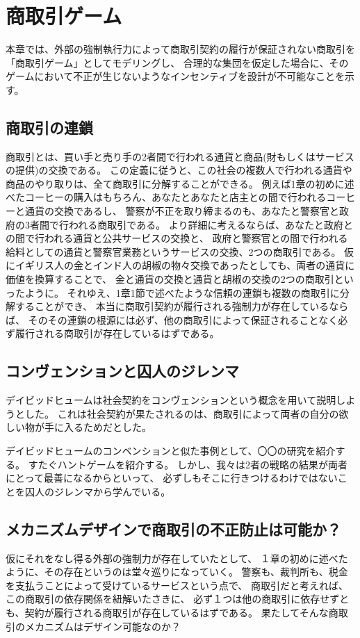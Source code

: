 \chapter{商取引ゲーム}
本章では、外部の強制執行力によって商取引契約の履行が保証されない商取引を「商取引ゲーム」としてモデリングし、
合理的な集団を仮定した場合に、そのゲームにおいて不正が生じないようなインセンティブを設計が不可能なことを示す。

\section{商取引の連鎖}
商取引とは、買い手と売り手の2者間で行われる通貨と商品(財もしくはサービスの提供)の交換である。
この定義に従うと、この社会の複数人で行われる通貨や商品のやり取りは、全て商取引に分解することができる。
例えば1章の初めに述べたコーヒーの購入はもちろん、あなたとあなたと店主との間で行われるコーヒーと通貨の交換であるし、
警察が不正を取り締まるのも、あなたと警察官と政府の3者間で行われる商取引である。
より詳細に考えるならば、あなたと政府との間で行われる通貨と公共サービスの交換と、
政府と警察官との間で行われる給料としての通貨と警察官業務というサービスの交換、2つの商取引である。
仮にイギリス人の金とインド人の胡椒の物々交換であったとしても、両者の通貨に価値を換算することで、
金と通貨の交換と通貨と胡椒の交換の2つの商取引といったように。
それゆえ、1章1節で述べたような信頼の連鎖も複数の商取引に分解することができ、
本当に商取引契約が履行される強制力が存在しているならば、
そのその連鎖の根源には必ず、他の商取引によって保証されることなく必ず履行される商取引が存在しているはずである。


\section{コンヴェンションと囚人のジレンマ}
デイビッドヒュームは社会契約をコンヴェンションという概念を用いて説明しようとした。
これは社会契約が果たされるのは、商取引によって両者の自分の欲しい物が手に入るためだとした。


デイビッドヒュームのコンベンションと似た事例として、〇〇の研究を紹介する。
すたぐハントゲームを紹介する。
しかし、我々は2者の戦略の結果が両者にとって最善になるからといって、
必ずしもそこに行きつけるわけではないことを囚人のジレンマから学んでいる。


\section{メカニズムデザインで商取引の不正防止は可能か？}
仮にそれをなし得る外部の強制力が存在していたとして、
１章の初めに述べたように、その存在というのは堂々巡りになっていく。
警察も、裁判所も、税金を支払うことによって受けているサービスという点で、
商取引だと考えれば、この商取引の依存関係を紐解いたさきに、
必ず１つは他の商取引に依存せずとも、契約が履行される商取引が存在しているはずである。
果たしてそんな商取引のメカニズムはデザイン可能なのか？

